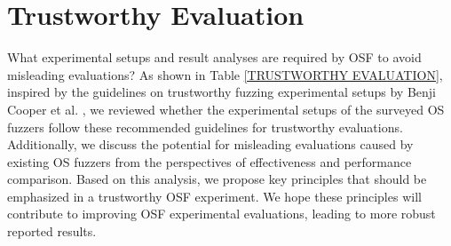 
\section{Trustworthy Evaluation}\label{Section6}

What experimental setups and result analyses are required by OSF to avoid misleading evaluations? As shown in Table \ref{TRUSTWORTHY EVALUATION}, inspired by the guidelines on trustworthy fuzzing experimental setups by Benji Cooper et al. \cite{Klees2018EvaluatingFT}, we reviewed whether the experimental setups of the surveyed OS fuzzers follow these recommended guidelines for trustworthy evaluations. Additionally, we discuss the potential for misleading evaluations caused by existing OS fuzzers from the perspectives of effectiveness and performance comparison. Based on this analysis, we propose key principles that should be emphasized in a trustworthy OSF experiment. We hope these principles will contribute to improving OSF experimental evaluations, leading to more robust reported results.




